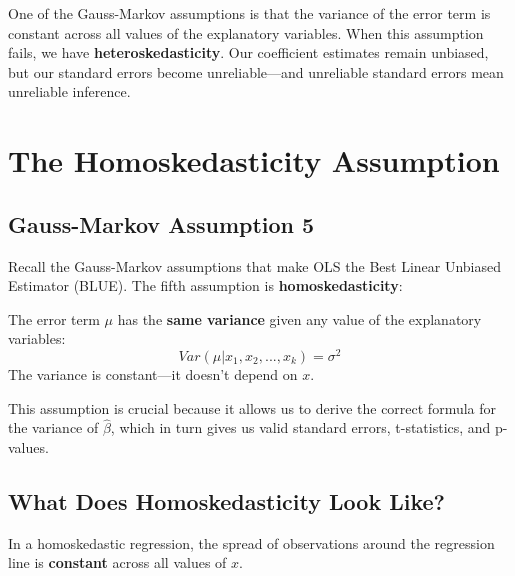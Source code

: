 \documentclass[
  letterpaper,
  DIV=11,
  numbers=noendperiod]{scrreprt}
\begin{document}
One of the Gauss-Markov assumptions is that the variance of the error
term is constant across all values of the explanatory variables. When
this assumption fails, we have \textbf{heteroskedasticity}. Our
coefficient estimates remain unbiased, but our standard errors become
unreliable---and unreliable standard errors mean unreliable inference.

\section{The Homoskedasticity
Assumption}\label{the-homoskedasticity-assumption}

\subsection{Gauss-Markov Assumption 5}\label{gauss-markov-assumption-5}

Recall the Gauss-Markov assumptions that make OLS the Best Linear
Unbiased Estimator (BLUE). The fifth assumption is
\textbf{homoskedasticity}:

\begin{tcolorbox}[enhanced jigsaw, arc=.35mm, bottomrule=.15mm, bottomtitle=1mm, breakable, colback=white, colbacktitle=quarto-callout-note-color!10!white, colframe=quarto-callout-note-color-frame, coltitle=black, left=2mm, leftrule=.75mm, opacityback=0, opacitybacktitle=0.6, rightrule=.15mm, title=\textcolor{quarto-callout-note-color}{\faInfo}\hspace{0.5em}{Homoskedasticity}, titlerule=0mm, toprule=.15mm, toptitle=1mm]

The error term \(\mu\) has the \textbf{same variance} given any value of
the explanatory variables: \[Var(\mu | x_1, x_2, ..., x_k) = \sigma^2\]
The variance is constant---it doesn't depend on \(x\).

\end{tcolorbox}

This assumption is crucial because it allows us to derive the correct
formula for the variance of \(\hat{\beta}\), which in turn gives us
valid standard errors, t-statistics, and p-values.

\subsection{What Does Homoskedasticity Look
Like?}\label{what-does-homoskedasticity-look-like}

In a homoskedastic regression, the spread of observations around the
regression line is \textbf{constant} across all values of \(x\).
\end{document}
